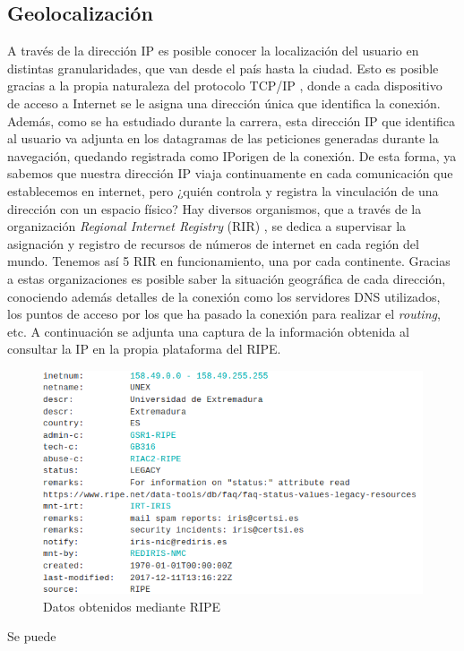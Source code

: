 \documentclass[12pt,a4paper,oneside]{book} %
\begin{document}
\subsection{Geolocalización}
A través de la dirección IP es posible conocer la localización del usuario en distintas granularidades, que van desde el país hasta la ciudad. 
\newline \newline
Esto es posible gracias a la propia naturaleza del protocolo TCP/IP \cite{manolito}, donde a cada dispositivo de acceso a Internet se le asigna una dirección única que identifica la conexión. Además, como se ha estudiado durante la carrera, esta dirección IP que identifica al usuario va adjunta en los datagramas de las peticiones generadas durante la navegación, quedando registrada como IPorigen de la conexión. 
\newline \newline
De esta forma, ya sabemos que nuestra dirección IP viaja continuamente en cada comunicación que establecemos en internet, pero ¿quién controla y registra la vinculación de una dirección con un espacio físico? Hay diversos organismos, que a través de la organización \textit{Regional Internet Registry} (RIR) \cite{RIR}, se dedica a supervisar la asignación y registro de recursos de números de internet en cada región del mundo. Tenemos así 5 RIR en funcionamiento, una por cada continente. 
\newline \newline
Gracias a estas organizaciones es posible saber la situación geográfica de cada dirección, conociendo además detalles de la conexión \cite{ripe} como los servidores DNS utilizados, los puntos de acceso por los que ha pasado la conexión para realizar el \textit{routing}, etc. A continuación se adjunta una captura de la información obtenida al consultar la IP en la propia plataforma del RIPE. 
\begin{figure}[H]
	\begin{center}
   		\includegraphics[scale=0.5]{pictures/data/ripedata.png}
	    	\caption{Datos obtenidos mediante RIPE}
   		\label{fig:Datos obtenidos mediante RIPE}
	\end{center}
\end{figure}
Se puede 
\end{document}
